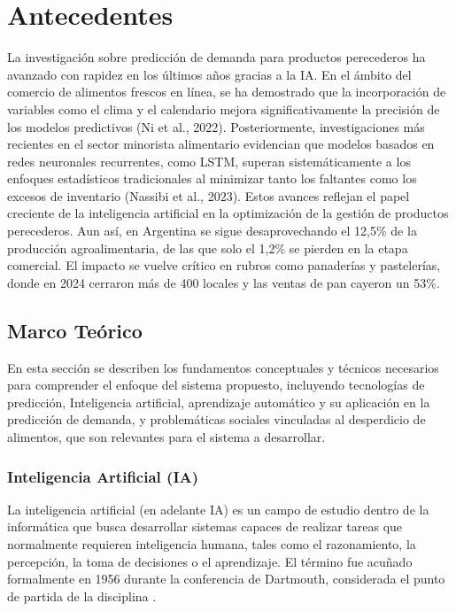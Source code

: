 \chapter{Antecedentes}\label{chapter02}

La investigación sobre predicción de demanda para productos perecederos ha avanzado con rapidez en los últimos años gracias a la IA. En el ámbito del comercio de alimentos frescos en línea, se ha demostrado que la incorporación de variables como el clima y el calendario mejora significativamente la precisión de los modelos predictivos (Ni et al., 2022). Posteriormente, investigaciones más recientes en el sector minorista alimentario evidencian que modelos basados en redes neuronales recurrentes, como LSTM, superan sistemáticamente a los enfoques estadísticos tradicionales al minimizar tanto los faltantes como los excesos de inventario (Nassibi et al., 2023). Estos avances reflejan el papel creciente de la inteligencia artificial en la optimización de la gestión de productos perecederos. Aun así, en Argentina se sigue desaprovechando el 12,5\% de la producción agroalimentaria, de las que solo el 1,2\% se pierden en la etapa comercial. El impacto se vuelve crítico en rubros como panaderías y pastelerías, donde en 2024 cerraron más de 400 locales y las ventas de pan cayeron un 53\%.


\section{Marco Teórico}

En esta sección se describen los fundamentos conceptuales y técnicos necesarios para comprender el enfoque del sistema propuesto, incluyendo tecnologías de predicción, Inteligencia artificial, aprendizaje automático y su aplicación en la predicción de demanda, y problemáticas sociales vinculadas al desperdicio de alimentos, que son relevantes para el sistema a desarrollar.


\subsection{Inteligencia Artificial (IA)}

La inteligencia artificial (en adelante IA) es un campo de estudio dentro de la informática que busca desarrollar sistemas capaces de realizar tareas que normalmente requieren inteligencia humana, tales como el razonamiento, la percepción, la toma de decisiones o el aprendizaje. El término fue acuñado formalmente en 1956 durante la conferencia de Dartmouth, considerada el punto de partida de la disciplina \parencite{mccarthy1955}.\\

